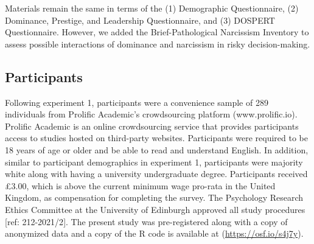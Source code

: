 \documentclass[
  donotrepeattitle,doc, 12pt, a4paper,floatsintext]{apa7}
\begin{document}
Materials remain the same in terms of the (1) Demographic Questionnaire, (2) Dominance, Prestige, and Leadership Questionnaire, and (3) DOSPERT Questionnaire. However, we added the Brief-Pathological Narcissism Inventory to assess possible interactions of dominance and narcissism in risky decision-making.

\hypertarget{participants}{%
\subsection{Participants}\label{participants}}

Following experiment 1, participants were a convenience sample of 289 individuals from Prolific Academic's crowdsourcing platform (www.prolific.io). Prolific Academic is an online crowdsourcing service that provides participants access to studies hosted on third-party websites. Participants were required to be 18 years of age or older and be able to read and understand English. In addition, similar to participant demographics in experiment 1, participants were majority white along with having a university undergraduate degree. Participants received £3.00, which is above the current minimum wage pro-rata in the United Kingdom, as compensation for completing the survey. The Psychology Research Ethics Committee at the University of Edinburgh approved all study procedures {[}ref: 212-2021/2{]}. The present study was pre-registered along with a copy of anonymized data and a copy of the R code is available at (\url{https://osf.io/s4j7y}).
\end{document}
